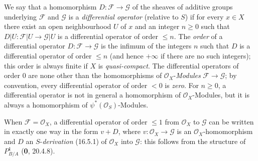 We say that a homomorphism $D:\mathscr{F}\to\mathscr{G}$ of the sheaves of
additive groups underlying $\mathscr{F}$ and $\mathscr{G}$ is a
\emph{differential operator} (relative to $S$) if for every $x\in X$ there
exist an open neighbourhood $U$ of $x$ and an integer $n\geq0$ such that
$D|U:\mathscr{F}|U\to\mathscr{G}|U$ is a differential operator of order
$\leq n$. The \emph{order} of a differential operator
$D:\mathscr{F}\to\mathscr{G}$ is the infimum of the integers $n$ such
that $D$ is a differential operator of order $\leq n$ (and hence $+\infty$
if there are no such integers); this order is always finite if $X$ is
\emph{quasi-compact}. The differential operators of order $0$ are none other
than the homomorphisms of $\mathcal{O}_X$-\emph{Modules}
$\mathscr{F}\to\mathscr{G}$; by convention, every differential operator
of order $<0$ is \emph{zero}. For $n\geq0$, a differential operator is
not in general a homomorphism of $\mathcal{O}_X$-Modules, but it is always
a homomorphism of $\psi^*(\mathcal{O}_S)$-Modules.

When $\mathscr{F}=\mathcal{O}_X$, a differential operator of order
$\leq1$ from $\mathcal{O}_X$ to $\mathscr{G}$ can be written in exactly one
way in the form $v+D$, where $v:\mathcal{O}_X\to\mathscr{G}$ is an
$\mathcal{O}_X$-homomorphism and $D$ an $S$-\emph{derivation} (16.5.1) of
$\mathcal{O}_X$ into $\mathscr{G}$: this follows from the structure of
$P_{B/A}^1$ (\textbf{0}, 20.4.8).

